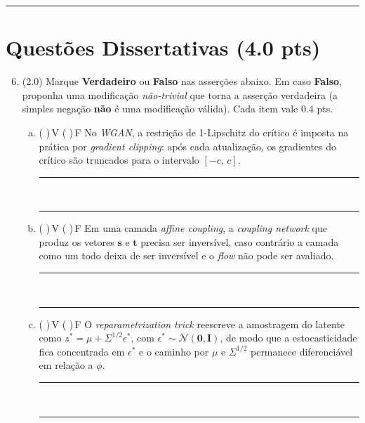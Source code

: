 \documentclass[11pt,a4paper]{article}
\begin{document}
\begin{enumerate}[1)]
\end{enumerate}

\rule{\linewidth}{0.4pt}

\section*{Questões Dissertativas (4.0 pts)}

\begin{enumerate}[1)]
\setcounter{enumi}{5}

\item (2.0) Marque \textbf{Verdadeiro} ou \textbf{Falso} nas asserções abaixo. Em caso \textbf{Falso}, proponha uma modificação \emph{não-trivial} que torna a asserção verdadeira (a simples negação \textbf{não} é uma modificação válida). Cada item vale 0.4 pts.

\begin{enumerate}[a)]
    \item ( )\,V \quad ( )\,F \quad No \textit{WGAN}, a restrição de 1-Lipschitz do crítico é imposta na prática por \textit{gradient clipping}: após cada atualização, os gradientes do crítico são truncados para o intervalo $[-c,\,c]$.\\[0.2em]
    \rule{\linewidth}{0.4pt}\\[0.2em]
    \rule{\linewidth}{0.4pt}

    \item ( )\,V \quad ( )\,F \quad Em uma camada \textit{affine coupling}, a \textit{coupling network} que produz os vetores $\mathbf{s}$ e $\mathbf{t}$ precisa ser inversível, caso contrário a camada como um todo deixa de ser inversível e o \textit{flow} não pode ser avaliado.\\[0.2em]
    \rule{\linewidth}{0.4pt}\\[0.2em]
    \rule{\linewidth}{0.4pt}

    \item ( )\,V \quad ( )\,F \quad O \textit{reparametrization trick} reescreve a amostragem do latente como $z^{*} = \mu + \Sigma^{1/2}\epsilon^{*}$, com $\epsilon^{*} \sim \mathcal{N}(\mathbf{0},\mathbf{I})$, de modo que a estocasticidade fica concentrada em $\epsilon^{*}$ e o caminho por $\mu$ e $\Sigma^{1/2}$ permanece diferenciável em relação a $\phi$.\\[0.2em]
    \rule{\linewidth}{0.4pt}\\[0.2em]
    \rule{\linewidth}{0.4pt}


\end{enumerate}
\end{enumerate}
\end{document}
